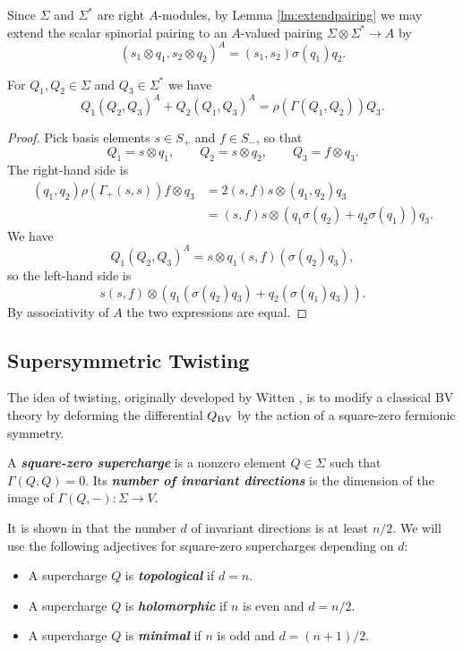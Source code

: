 \documentclass[10pt, oneside]{article}
\newcommand{\defterm}[1]{\textbf{\emph{#1}}}
\begin{document}
Since $\Sigma$ and $\Sigma^*$ are right $A$-modules, by Lemma \ref{lm:extendpairing} we may extend the scalar spinorial pairing to an $A$-valued pairing $\Sigma\otimes \Sigma^*\rightarrow A$ by
\[(s_1\otimes q_1, s_2\otimes q_2)^A = (s_1, s_2)\sigma(q_1) q_2.\]

\begin{theorem}
For $Q_1, Q_2\in\Sigma$ and $Q_3\in\Sigma^*$ we have
\[Q_1(Q_2, Q_3)^A + Q_2(Q_1, Q_3)^A = \rho(\Gamma(Q_1, Q_2))Q_3.\]
\label{thm:2dmatter3psi}
\end{theorem}
\begin{proof}
Pick basis elements $s\in S_+$ and $f\in S_-$, so that
\[Q_1 = s\otimes q_1,\qquad Q_2 = s\otimes q_2,\qquad Q_3 = f\otimes q_3.\]
The right-hand side is
\begin{align*}
(q_1, q_2) \rho(\Gamma_+(s, s)) f\otimes q_3 &= 2(s, f) s\otimes (q_1, q_2) q_3 \\
&= (s, f) s\otimes (q_1\sigma(q_2) + q_2\sigma(q_1)) q_3.
\end{align*}
We have
\[Q_1(Q_2, Q_3)^A = s\otimes q_1 (s, f) (\sigma(q_2)q_3),\]
so the left-hand side is
\[s(s, f)\otimes (q_1(\sigma(q_2) q_3) + q_2(\sigma(q_1)q_3)).\]
By associativity of $A$ the two expressions are equal.
\end{proof}

\subsection{Supersymmetric Twisting}
The idea of twisting, originally developed by Witten \cite{WittenTQFT}, is to modify a classical BV theory by deforming the differential $Q_{\mathrm{BV}}$ by the action of a square-zero fermionic symmetry. 

\begin{definition}
A \defterm{square-zero supercharge} is a nonzero element $Q\in\Sigma$ such that $\Gamma(Q, Q)=0$. Its \defterm{number of invariant directions} is the dimension of the image of $\Gamma(Q, -)\colon \Sigma\rightarrow V$.
\end{definition}

It is shown in \cite[Proposition 3.25]{ElliottSafronov} that the number $d$ of invariant directions is at least $n/2$. We will use the following adjectives for square-zero supercharges depending on $d$:
\begin{itemize}
\item A supercharge $Q$ is \defterm{topological} if $d = n$.

\item A supercharge $Q$ is \defterm{holomorphic} if $n$ is even and $d=n/2$.

\item A supercharge $Q$ is \defterm{minimal} if $n$ is odd and $d=(n+1)/2$.
\end{itemize}
\end{document}
